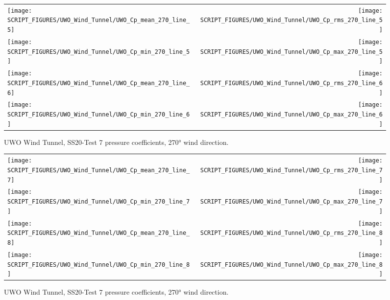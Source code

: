 \begin{figure}[p]
\begin{tabular*}{\textwidth}{l@{\extracolsep{\fill}}r}
\texttt{[image: SCRIPT\_FIGURES/UWO\_Wind\_Tunnel/UWO\_Cp\_mean\_270\_line\_5]} &
\texttt{[image: SCRIPT\_FIGURES/UWO\_Wind\_Tunnel/UWO\_Cp\_rms\_270\_line\_5]} \\
\texttt{[image: SCRIPT\_FIGURES/UWO\_Wind\_Tunnel/UWO\_Cp\_min\_270\_line\_5]} &
\texttt{[image: SCRIPT\_FIGURES/UWO\_Wind\_Tunnel/UWO\_Cp\_max\_270\_line\_5]} \\
\texttt{[image: SCRIPT\_FIGURES/UWO\_Wind\_Tunnel/UWO\_Cp\_mean\_270\_line\_6]} &
\texttt{[image: SCRIPT\_FIGURES/UWO\_Wind\_Tunnel/UWO\_Cp\_rms\_270\_line\_6]} \\
\texttt{[image: SCRIPT\_FIGURES/UWO\_Wind\_Tunnel/UWO\_Cp\_min\_270\_line\_6]} &
\texttt{[image: SCRIPT\_FIGURES/UWO\_Wind\_Tunnel/UWO\_Cp\_max\_270\_line\_6]}
\end{tabular*}
\caption[UWO Wind Tunnel, SS20-Test 7 pressure coefficients, 270\si{\degree}]{UWO Wind Tunnel, SS20-Test 7 pressure coefficients, 270\si{\degree} wind direction.}
\label{UWO_Test_7_pressure_coefficients_270_1}
\end{figure}

\begin{figure}[p]
\begin{tabular*}{\textwidth}{l@{\extracolsep{\fill}}r}
\texttt{[image: SCRIPT\_FIGURES/UWO\_Wind\_Tunnel/UWO\_Cp\_mean\_270\_line\_7]} &
\texttt{[image: SCRIPT\_FIGURES/UWO\_Wind\_Tunnel/UWO\_Cp\_rms\_270\_line\_7]} \\
\texttt{[image: SCRIPT\_FIGURES/UWO\_Wind\_Tunnel/UWO\_Cp\_min\_270\_line\_7]} &
\texttt{[image: SCRIPT\_FIGURES/UWO\_Wind\_Tunnel/UWO\_Cp\_max\_270\_line\_7]} \\
\texttt{[image: SCRIPT\_FIGURES/UWO\_Wind\_Tunnel/UWO\_Cp\_mean\_270\_line\_8]} &
\texttt{[image: SCRIPT\_FIGURES/UWO\_Wind\_Tunnel/UWO\_Cp\_rms\_270\_line\_8]}  \\
\texttt{[image: SCRIPT\_FIGURES/UWO\_Wind\_Tunnel/UWO\_Cp\_min\_270\_line\_8]} &
\texttt{[image: SCRIPT\_FIGURES/UWO\_Wind\_Tunnel/UWO\_Cp\_max\_270\_line\_8]}
\end{tabular*}
\caption[UWO Wind Tunnel, SS20-Test 7 pressure coefficients, 270\si{\degree}]{UWO Wind Tunnel, SS20-Test 7 pressure coefficients, 270\si{\degree} wind direction.}
\label{UWO_Test_7_pressure_coefficients_270_2}
\end{figure}


